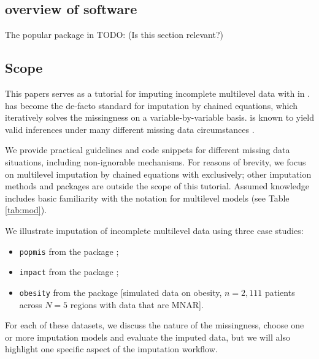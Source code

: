 \documentclass[
  article]{jss}
\providecommand{\tightlist}{%
  \setlength{\itemsep}{0pt}\setlength{\parskip}{0pt}}\usepackage{longtable,booktabs,array}
\begin{document}
\hypertarget{overview-of-software}{%
\subsection{overview of software}\label{overview-of-software}}

The popular  package in  \citet{R} TODO:
\citet{Hanne}(Is this section relevant?)

\hypertarget{scope}{%
\subsection{Scope}\label{scope}}

This papers serves as a tutorial for imputing incomplete multilevel data
with  in .  has become the de-facto
standard for imputation by chained equations, which iteratively solves
the missingness on a variable-by-variable basis.  is known to
yield valid inferences under many different missing data circumstances
\citep{buur18}.

We provide practical guidelines and code snippets for different missing
data situations, including non-ignorable mechanisms. For reasons of
brevity, we focus on multilevel imputation by chained equations with
 exclusively; other imputation methods and packages \citep[see
e.g.][ and \citet{grun18}]{audi18} are outside the scope of this
tutorial. Assumed knowledge includes basic familiarity with the
 notation for multilevel models (see Table \ref{tab:mod}).

We illustrate imputation of incomplete multilevel data using three case
studies:

\begin{itemize}
\tightlist
\item
  \texttt{popmis} from the  package \citep[simulated data on
  perceived popularity, \(n = 2,000\) pupils across \(N = 100\) schools
  with data that are MAR,][]{mice};
\item
  \texttt{impact} from the  package \citep[empirical data
  on traumatic brain injuries, \(n = 11,022\) patients across \(N = 15\)
  studies with data that are MAR,][]{metamisc};
\item
  \texttt{obesity} from the  package {[}simulated data on
  obesity, \(n = 2,111\) patients across \(N = 5\) regions with data
  that are MNAR{]}.
\end{itemize}

For each of these datasets, we discuss the nature of the missingness,
choose one or more imputation models and evaluate the imputed data, but
we will also highlight one specific aspect of the imputation workflow.
\end{document}
